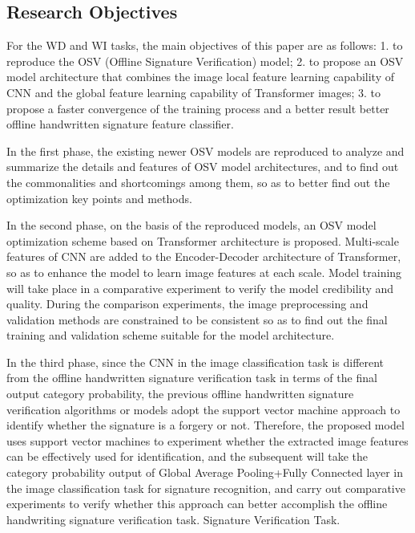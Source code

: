 \documentclass{article}
\begin{document}
\newpage

\subsection{Research Objectives}

For the WD and WI tasks, the main objectives of this paper are as follows: 1. to reproduce the OSV (Offline Signature Verification) model; 2. to propose an OSV model architecture that combines the image local feature learning capability of CNN and the global feature learning capability of Transformer images; 3. to propose a faster convergence of the training process and a better result better offline handwritten signature feature classifier.

In the first phase, the existing newer OSV models are reproduced to analyze and summarize the details and features of OSV model architectures, and to find out the commonalities and shortcomings among them, so as to better find out the optimization key points and methods.

In the second phase, on the basis of the reproduced models, an OSV model optimization scheme based on Transformer architecture is proposed. Multi-scale features of CNN are added to the Encoder-Decoder architecture of Transformer, so as to enhance the model to learn image features at each scale. Model training will take place in a comparative experiment to verify the model credibility and quality. During the comparison experiments, the image preprocessing and validation methods are constrained to be consistent so as to find out the final training and validation scheme suitable for the model architecture.

In the third phase, since the CNN in the image classification task is different from the offline handwritten signature verification task in terms of the final output category probability, the previous offline handwritten signature verification algorithms or models adopt the support vector machine approach to identify whether the signature is a forgery or not. Therefore, the proposed model uses support vector machines to experiment whether the extracted image features can be effectively used for identification, and the subsequent will take the category probability output of Global Average Pooling+Fully Connected layer in the image classification task for signature recognition, and carry out comparative experiments to verify whether this approach can better accomplish the offline handwriting signature verification task. Signature Verification Task.
\end{document}
